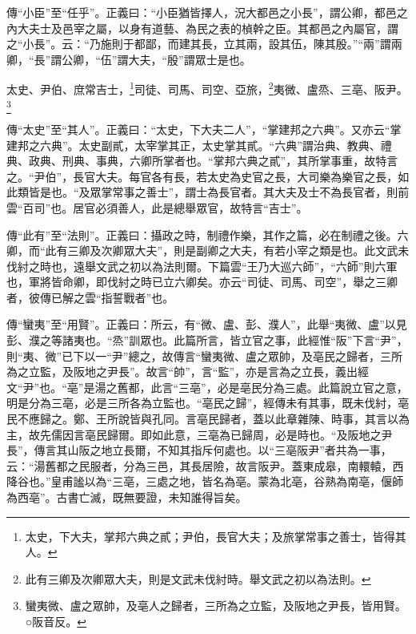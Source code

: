 {\noindent\zhuan{}\fzbyks 傳“小臣”至“任乎”。正義曰：“小臣猶皆擇人，況大都邑之小長”，謂公卿，都邑之內大夫士及邑宰之屬，以身有道藝、為民之表的楨幹之臣。其都邑之內屬官，謂之“小長”。云：“乃施則于都鄙，而建其長，立其兩，設其伍，陳其殷。”“兩”謂兩卿，“長”謂公卿，“伍”謂大夫，“殷”謂眾士是也。 \par}

太史、尹伯、庶常吉士，\footnote{太史，下大夫，掌邦六典之貳；尹伯，長官大夫；及旅掌常事之善士，皆得其人。}司徒、司馬、司空、亞旅，\footnote{此有三卿及次卿眾大夫，則是文武未伐紂時。舉文武之初以為法則。}夷微、盧烝、三亳、阪尹。\footnote{蠻夷微、盧之眾帥，及亳人之歸者，三所為之立監，及阪地之尹長，皆用賢。○阪音反。}

{\noindent\zhuan{}\fzbyks 傳“太史”至“其人”。正義曰：“太史，下大夫二人”，“掌建邦之六典”。又亦云“掌建邦之六典”。太史副貳，太宰掌其正，太史掌其貳。“六典”謂治典、教典、禮典、政典、刑典、事典，六卿所掌者也。“掌邦六典之貳”，其所掌事重，故特言之。“尹伯”，長官大夫。每官各有長，若太史為史官之長，大司樂為樂官之長，如此類皆是也。“及眾掌常事之善士”，謂士為長官者。其大夫及士不為長官者，則前雲“百司”也。居官必須善人，此是總舉眾官，故特言“吉士”。 \par}

{\noindent\zhuan{}\fzbyks 傳“此有”至“法則”。正義曰：攝政之時，制禮作樂，其作之篇，必在制禮之後。六卿，而“此有三卿及次卿眾大夫”，則是副卿之大夫，有若小宰之類是也。此文武未伐紂之時也，遠舉文武之初以為法則爾。下篇雲“王乃大巡六師”，“六師”則六軍也，軍將皆命卿，即伐紂之時已立六卿矣。亦云“司徒、司馬、司空”，舉之三卿者，彼傳已解之雲“指誓戰者”也。 \par}

{\noindent\zhuan{}\fzbyks 傳“蠻夷”至“用賢”。正義曰：所云，有“微、盧、彭、濮人”，此舉“夷微、盧”以見彭、濮之等諸夷也。“烝”訓眾也。此篇所言，皆立官之事，此經惟“阪”下言“尹”，則“夷、微”已下以一“尹”總之，故傳言“蠻夷微、盧之眾帥，及亳民之歸者，三所為之立監，及阪地之尹長”。故言“帥”，言“監”，亦是言為之立長，義出經文“尹”也。“亳”是湯之舊都，此言“三亳”，必是亳民分為三處。此篇說立官之意，明是分為三亳，必是三所各為立監也。“亳民之歸”，經傳未有其事，既未伐紂，亳民不應歸之。鄭、王所說皆與孔同。言亳民歸者，蓋以此章雜陳、時事，其言以為主，故先儒因言亳民歸爾。即如此意，三亳為已歸周，必是時也。“及阪地之尹長”，傳言其山阪之地立長爾，不知其指斥何處也。以“三亳阪尹”者共為一事，云：“湯舊都之民服者，分為三邑，其長居險，故言阪尹。蓋東成皋，南轘轅，西降谷也。”皇甫謐以為“三亳，三處之地，皆名為亳。蒙為北亳，谷熟為南亳，偃師為西亳”。古書亡滅，既無要證，未知誰得旨矣。 \par}

